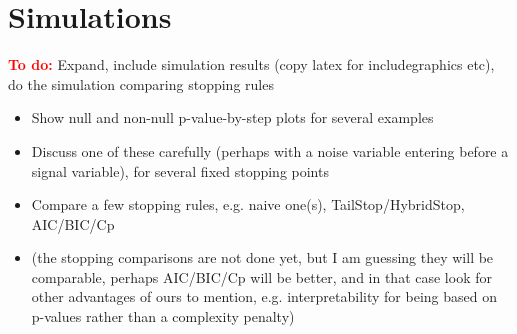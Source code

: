 \documentclass{imsart}
\newcommand{\todo}{\textcolor{red}{\textbf{To do: }}}
\begin{document}
\section{Simulations}
\label{sec:simulations}

\todo Expand, include simulation results (copy latex for
includegraphics etc), do the simulation comparing stopping rules

\begin{itemize}
  \item Show null and non-null p-value-by-step plots for several examples
  \item Discuss one of these carefully (perhaps with a noise variable
    entering before a signal variable), for several fixed stopping points
  \item Compare a few stopping rules, e.g. naive one(s),
    TailStop/HybridStop, AIC/BIC/Cp
  \item (the stopping comparisons are not done yet, but I am guessing
    they will be comparable, perhaps AIC/BIC/Cp will be better, and in
    that case look for other advantages of ours to mention,
    e.g. interpretability for being based on p-values rather than a
    complexity penalty)

\end{itemize}
\end{document}
